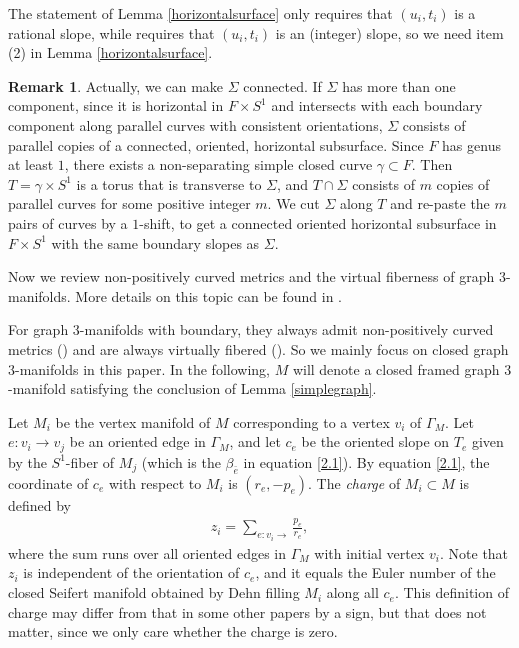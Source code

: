 \documentclass{amsart}
\numberwithin{equation}{section}
\theoremstyle{definition}
\newtheorem{remark}[theorem]{Remark}
\begin{document}
The statement of Lemma \ref{horizontalsurface} only requires that $(u_i,t_i)$ is a rational slope, while \cite[Lemma 1.1]{WY} requires that $(u_i,t_i)$ is an (integer) slope, so we need item (2) in Lemma \ref{horizontalsurface}.


\begin{remark}\label{connected} 
Actually, we can make $\Sigma$ connected. If $\Sigma$ has more than one component, since it is horizontal in $F\times S^1$ and intersects with each boundary component along parallel curves with consistent orientations, $\Sigma$ consists of parallel copies of a connected, oriented, horizontal subsurface. Since $F$ has genus at least $1$, there exists a non-separating simple closed curve $\gamma \subset F$. Then $T=\gamma \times S^1$ is a torus that is transverse to $\Sigma$, and $T\cap \Sigma$ consists of $m$ copies of parallel curves for some positive integer $m$. We cut $\Sigma$ along $T$ and re-paste the $m$ pairs of curves by a $1$-shift, to get a connected oriented horizontal subsurface in $F\times S^1$ with the same boundary slopes as $\Sigma$.
\end{remark}

Now we review non-positively curved metrics and the virtual fiberness of graph $3$-manifolds. More details on this topic can be found in \cite{BS}.

For graph $3$-manifolds with boundary, they always admit non-positively curved metrics (\cite{Leeb}) and are always virtually fibered (\cite{WY}). So we mainly focus on closed graph $3$-manifolds in this paper. In the following, $M$ will denote a closed framed graph $3$-manifold satisfying the conclusion of Lemma \ref{simplegraph}.


Let $M_i$ be the vertex manifold of $M$ corresponding to a vertex $v_i$ of $\Gamma_M$. Let $e:v_i\to v_j$ be an oriented edge in $\Gamma_M$, and let $c_e$ be the oriented slope on $T_{e}$ given by the $S^1$-fiber of $M_j$ (which is the $\beta_{\bar{e}}$ in equation \eqref{2.1}). By equation \eqref{2.1}, the coordinate of $c_e$ with respect to $M_i$ is $(r_e,-p_e)$. The {\it charge} of $M_i\subset M$ is defined by 
\begin{align}\label{2.3}
z_i=\sum_{e:v_i\to } \frac{p_e}{r_e},
\end{align}
where the sum runs over all oriented edges in $\Gamma_M$ with initial vertex $v_i$.
Note that $z_i$ is independent of the orientation of $c_e$, and it equals the Euler number of the closed Seifert manifold obtained by Dehn filling $M_i$ along all $c_e$. This definition of charge may differ from that in some other papers by a sign, but that does not matter, since we only care whether the charge is zero.
\end{document}
